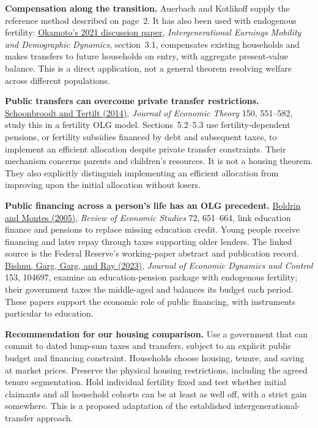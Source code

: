 \documentclass[11pt]{article}
\newcommand{\reading}[2]{\href{#1}{#2}}
\begin{document}
\textbf{Compensation along the transition.} Auerbach and Kotlikoff supply the
reference method described on page~2. It has also been used with endogenous
fertility: \reading{https://www.e.okayama-u.ac.jp/economic_association/paper/pdf/\%E2\%85\%A0-112.pdf}{Okamoto's 2021 discussion paper},
\emph{Intergenerational Earnings Mobility and Demographic Dynamics}, section~3.1,
compensates existing households and makes transfers to future households on
entry, with aggregate present-value balance. This is a direct application,
not a general theorem resolving welfare across different populations.

\textbf{Public transfers can overcome private transfer restrictions.}
\reading{https://tertilt.vwl.uni-mannheim.de/research/JET2013.pdf}{Schoonbroodt and Tertilt (2014)},
\emph{Journal of Economic Theory} 150, 551--582, study this in a fertility OLG
model. Sections~5.2--5.3 use fertility-dependent pensions, or fertility
subsidies financed by debt and subsequent taxes, to implement an efficient
allocation despite private transfer constraints. Their mechanism concerns
parents and children's resources. It is not a housing theorem. They also
explicitly distinguish implementing an efficient allocation from improving
upon the initial allocation without losers.

\textbf{Public financing across a person's life has an OLG precedent.}
\reading{https://www.minneapolisfed.org/research/staff-reports/the-intergenerational-state-education-and-pension}{Boldrin and Montes (2005)},
\emph{Review of Economic Studies} 72, 651--664, link education finance and
pensions to replace missing education credit. Young people receive financing
and later repay through taxes supporting older lenders. The linked source is
the Federal Reserve's working-paper abstract and publication record.
\reading{https://shresth-garg.github.io/pdfs/BGGR_fertility.pdf}{Bishnu, Garg, Garg, and Ray (2023)},
\emph{Journal of Economic Dynamics and Control} 153, 104697, examine an
education-pension package with endogenous fertility; their government taxes
the middle-aged and balances its budget each period. These papers support
the economic role of public financing, with instruments particular to education.

\textbf{Recommendation for our housing comparison.} Use a government that
can commit to dated lump-sum taxes and transfers, subject to an explicit
public budget and financing constraint. Households choose housing, tenure,
and saving at market prices. Preserve the physical housing restrictions,
including the agreed tenure segmentation. Hold individual fertility fixed
and test whether initial claimants and all household cohorts can be at least
as well off, with a strict gain somewhere. This is a proposed adaptation of
the established intergenerational-transfer approach.
\end{document}
